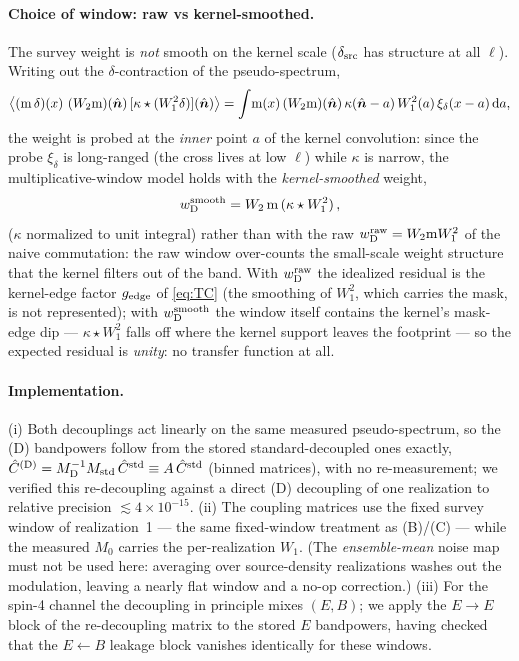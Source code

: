 \documentclass[11pt]{article}
\newcommand{\nv}{\hat{\boldsymbol{n}}}
\newcommand{\Wone}{W_1}
\newcommand{\Wtwo}{W_2}
\newcommand{\dt}{\delta}
\newcommand{\diff}{\mathrm{d}}
\begin{document}
\paragraph{Choice of window: raw vs kernel-smoothed.}
The survey weight is \emph{not} smooth on the kernel scale ($\delta_{\rm src}$
has structure at all $\ell$). Writing out the $\dt$-contraction of the
pseudo-spectrum,
\begin{equation}
\big\langle({\rm m}\,\dt)(x)\ (\Wtwo{\rm m})(\nv)\,[\kappa\star(\Wone^2\dt)](\nv)\big\rangle
=\int\!{\rm m}(x)\,(\Wtwo{\rm m})(\nv)\,\kappa(\nv-a)\,\Wone^2(a)\,
\xi_{\dt}(x-a)\,\diff a ,
\end{equation}
the weight is probed at the \emph{inner} point $a$ of the kernel convolution:
since the probe $\xi_\dt$ is long-ranged (the cross lives at low $\ell$) while
$\kappa$ is narrow, the multiplicative-window model holds with the
\emph{kernel-smoothed} weight,
\begin{equation}
w_{\rm D}^{\rm smooth}=\Wtwo\,{\rm m}\,(\kappa\star\Wone^2)\,,
\label{eq:wDsmooth}
\end{equation}
($\kappa$ normalized to unit integral) rather than with the raw
$w_{\rm D}^{\rm raw}=\Wtwo{\rm m}\Wone^2$ of the naive commutation: the raw
window over-counts the small-scale weight structure that the kernel filters out
of the band. With $w^{\rm raw}_{\rm D}$ the idealized residual is the kernel-edge
factor $g_{\rm edge}$ of \cref{eq:TC} (the smoothing of $\Wone^2$, which carries
the mask, is not represented); with $w^{\rm smooth}_{\rm D}$ the window itself
contains the kernel's mask-edge dip --- $\kappa\star\Wone^2$ falls off where the
kernel support leaves the footprint --- so the expected residual is \emph{unity}:
no transfer function at all.

\paragraph{Implementation.}
(i) Both decouplings act linearly on the same measured pseudo-spectrum, so the
(D) bandpowers follow from the stored standard-decoupled ones exactly,
$\hat C^{\rm (D)}=M_{\rm D}^{-1}M_{\rm std}\,\hat C^{\rm std}\equiv A\,\hat
C^{\rm std}$ (binned matrices), with no re-measurement; we verified this
re-decoupling against a direct (D) decoupling of one realization to relative
precision $\lesssim4\times10^{-15}$.
(ii) The coupling matrices use the fixed survey window of realization~1 --- the
same fixed-window treatment as (B)/(C) --- while the measured $M_0$ carries the
per-realization $\Wone$. (The \emph{ensemble-mean} noise map must not be used
here: averaging over source-density realizations washes out the modulation,
leaving a nearly flat window and a no-op correction.)
(iii) For the spin-4 channel the decoupling in principle mixes $(E,B)$; we apply
the $E\!\to\!E$ block of the re-decoupling matrix to the stored $E$ bandpowers,
having checked that the $E\!\leftarrow\!B$ leakage block vanishes identically for
these windows.
\end{document}
